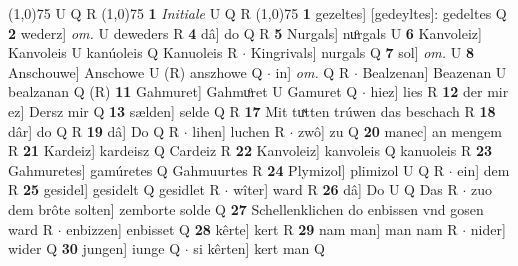 \documentclass[8pt,a4paper,notitlepage]{article}
\begin{document}
\begin{table}[ht]
\begin{minipage}[t]{0.5\linewidth}
\scriptsize
\line(1,0){75} \newline
U Q R \newline
\line(1,0){75} \newline
\textbf{1} \textit{Initiale} U Q R  \newline
\line(1,0){75} \newline
\textbf{1} gezeltes] [gedeyltes]: gedeltes Q \textbf{2} wederz] \textit{om.} U deweders R \textbf{4} dâ] do Q R \textbf{5} Nurgals] nuͦrgals U \textbf{6} Kanvoleiz] Kanvoleis U kanúoleis Q Kanuoleis R  $\cdot$ Kingrivals] nurgals Q \textbf{7} sol] \textit{om.} U \textbf{8} Anschouwe] Anschowe U (R) anszhowe Q  $\cdot$ in] \textit{om.} Q R  $\cdot$ Bealzenan] Beazenan U bealzanan Q (R) \textbf{11} Gahmuret] Gahmuͦret U Gamuret Q  $\cdot$ hiez] lies R \textbf{12} der mir ez] Dersz mir Q \textbf{13} sælden] selde Q R \textbf{17} Mit tuͯtten trúwen das beschach R \textbf{18} dâr] do Q R \textbf{19} dâ] Do Q R  $\cdot$ lihen] luchen R  $\cdot$ zwô] zu Q \textbf{20} manec] an mengem R \textbf{21} Kardeiz] kardeisz Q Cardeiz R \textbf{22} Kanvoleiz] kanvoleis Q kanuoleis R \textbf{23} Gahmuretes] gamúretes Q Gahmuurtes R \textbf{24} Plymizol] plimizol U Q R  $\cdot$ ein] dem R \textbf{25} gesidel] gesidelt Q gesidlet R  $\cdot$ wîter] ward R \textbf{26} dâ] Do U Q Das R  $\cdot$ zuo dem brôte solten] zemborte solde Q \textbf{27} Schellenklichen do enbissen vnd gosen ward R  $\cdot$ enbizzen] enbisset Q \textbf{28} kêrte] kert R \textbf{29} nam man] man nam R  $\cdot$ nider] wider Q \textbf{30} jungen] iunge Q  $\cdot$ si kêrten] kert man Q \newline
\end{minipage}
\end{table}
\end{document}
